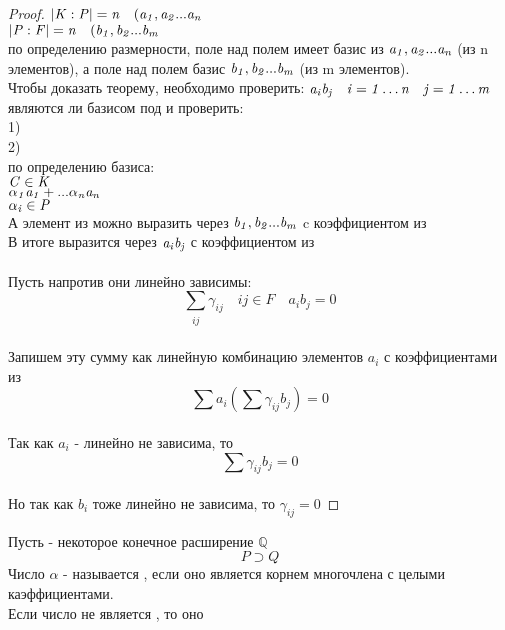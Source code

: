 \begin{proof}
	$\mathit {|K:P|=n \quad (a_{1}, a_{2}...a_{n}}$ \\
	$\mathit {|P:F|=n \quad (b_{1}, b_{2}...b_{m}}$ \\
	по определению размерности, поле  над полем  имеет базис из
	$\mathit {a_{1}, a_{2}...a_{n}}$ (из n элементов), а поле  над полем 
	базис $\mathit {b_{1}, b_{2}...b_{m}}$ (из m элементов). \\
	Чтобы доказать теорему, необходимо проверить: $\mathit{a_i b_j \quad i = 1 \ldots
	n \quad j = 1 \ldots m}$ \\
	являются ли базисом  под  и проверить: \\
	1)  \\
	2)  \\
	по определению базиса: \\
	$\mathit {C \in K}$ \\
	$\mathit {\alpha_{1} a_{1}+...\alpha_{n}a_{n}}$\\
	$\mathit{\alpha_{i} \in P}$ \\
	А элемент из  можно выразить через $\mathit {b_{1}, b_{2}...b_{m}}$ c
	коэффициентом из  \\
	В итоге  выразится через $\mathit{a_{i}b_{j}}$ с коэффициентом из  \\

	\\
	Пусть напротив они линейно зависимы: \\
	\[ \sum_{\substack {ij}} \gamma_{ij} \quad ij \in F \quad a_{i}b_{j} = 0\] \\
	Запишем эту сумму как линейную комбинацию элементов $a_i$ с коэффициентами из
	 \\
	\[ \sum a_{i} \left ( \sum \gamma_{ij} b_{j} \right) = 0 \] \\
	Так как $a_{i}$ - линейно не зависима, то \\
	\[\sum \gamma_{ij} b_{j} = 0\] \\
	Но так как $b_{i}$ тоже линейно не зависима, то $\gamma_{ij}=0$
\end{proof}

\begin{defin}
	Пусть  - некоторое конечное расширение $\mathbb Q$\\
	\[P \supset Q \]
	Число $\alpha$ - называется , если оно является корнем
	многочлена с целыми каэффициентами. \\
	Если число не является , то оно 
\end{defin}

